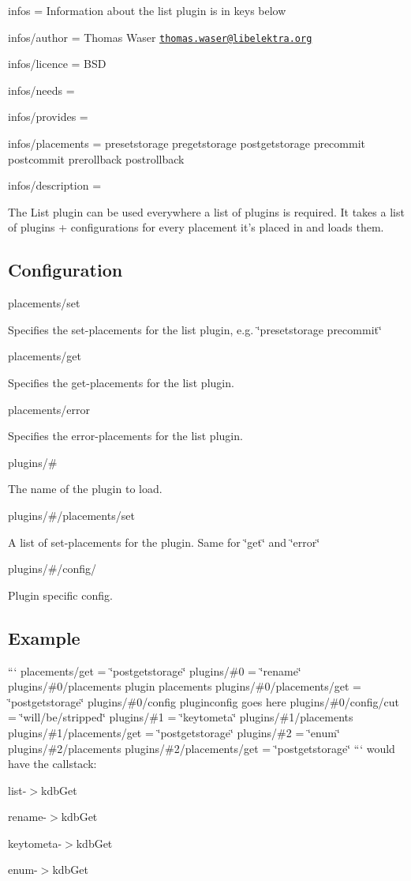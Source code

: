 
\begin{DoxyItemize}
\item infos = Information about the list plugin is in keys below
\item infos/author = Thomas Waser \href{mailto:thomas.waser@libelektra.org}{\tt thomas.\+waser@libelektra.\+org}
\item infos/licence = B\+S\+D
\item infos/needs =
\item infos/provides =
\item infos/placements = presetstorage pregetstorage postgetstorage precommit postcommit prerollback postrollback
\item infos/description =
\end{DoxyItemize}

The List plugin can be used everywhere a list of plugins is required. It takes a list of plugins + configurations for every placement it's placed in and loads them.

\subsection*{Configuration}

{\ttfamily placements/set}

Specifies the set-\/placements for the list plugin, e.\+g. \char`\"{}presetstorage precommit\char`\"{}

{\ttfamily placements/get}

Specifies the get-\/placements for the list plugin.

{\ttfamily placements/error}

Specifies the error-\/placements for the list plugin.

{\ttfamily plugins/\#}

The name of the plugin to load.

{\ttfamily plugins/\#/placements/set}

A list of set-\/placements for the plugin. Same for \char`\"{}get\char`\"{} and \char`\"{}error\char`\"{}

{\ttfamily plugins/\#/config/}

Plugin specific config.

\subsection*{Example}

``` placements/get = \char`\"{}postgetstorage\char`\"{} plugins/\#0 = \char`\"{}rename\char`\"{} plugins/\#0/placements plugin placements plugins/\#0/placements/get = \char`\"{}postgetstorage\char`\"{} plugins/\#0/config pluginconfig goes here plugins/\#0/config/cut = \char`\"{}will/be/stripped\char`\"{} plugins/\#1 = \char`\"{}keytometa\char`\"{} plugins/\#1/placements plugins/\#1/placements/get = \char`\"{}postgetstorage\char`\"{} plugins/\#2 = \char`\"{}enum\char`\"{} plugins/\#2/placements plugins/\#2/placements/get = \char`\"{}postgetstorage\char`\"{} ``` would have the callstack\+:


\begin{DoxyEnumerate}
\item list-\/$>$kdb\+Get
\begin{DoxyEnumerate}
\item rename-\/$>$kdb\+Get
\item keytometa-\/$>$kdb\+Get
\item enum-\/$>$kdb\+Get 
\end{DoxyEnumerate}
\end{DoxyEnumerate}